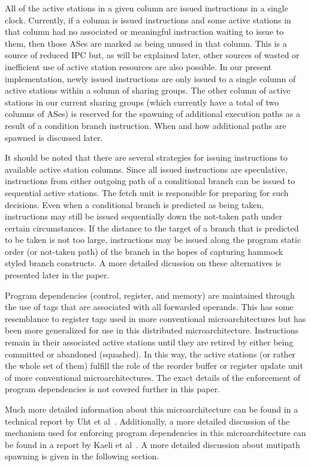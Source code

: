 \documentclass[10pt,dvips]{article}
\begin{document}
All of the active stations in a given column are issued instructions
in a single clock.  Currently, if a column is issued instructions
and some
active stations in that column had no associated or meaningful
instruction waiting to issue to them, then those ASes are marked
as being unused in that column.  This is a source of reduced IPC but, as will
be explained later, other sources of wasted or inefficient use of
active station resources are also possible.
In our present implementation, newly issued instructions
are only issued to a single column of active stations within
a solumn of sharing groups.  The other column of active stations
in our current sharing groups (which currently have a total
of two columns of ASes) is reserved for the spawning of additional
execution paths as a result of a condition branch instruction.
When and how additional paths are spawned is discussed later.

It should be noted that there are several strategies for
issuing instructions to available active station columns.
Since all issued instructions are speculative, instructions
from either outgoing path of a conditional branch can be issued
to sequential active stations.
The fetch unit is responsible for preparing for such decisions.
Even when a conditional branch is predicted as being taken,
instructions may still be issued sequentially down the not-taken
path under certain circumstances.  If the distance to the target 
of a branch
that is predicted to be taken is not too large,
instructions may be issued along the program static order (or not-taken
path) of the branch in the hopes of capturing hammock styled branch
constructs.  A more detailed dicussion on these alternatives is
presented later in the paper.

Program dependencies (control, register, and memory) are 
maintained through the use of tags that
are associated with all forwarded operands.
This has some resemblance to register tags used in more conventional 
microarchitectures but has been more generalized for use in this
distributed microarchitecture.  Instructions remain in their
associated active stations until they are retired by either being
committed or abandoned (squashed).  In this way, the active stations
(or rather the whole set of them)
fulfill the role of the reorder buffer or register update unit of more
conventional microarchitectures.
The exact details of the enforcement of program dependencies
is not covered further in this paper.

Much more detailed information about this microarchitecture
can be found in a technical report by Uht et al~\cite{Uht01}.
Additionally, a more detailed discussion of the mechanism used for
enforcing program dependencies in this microarchitecture
can be found in a report by Kaeli et al~\cite{Uht01}.
A more detailed discussion about mutipath spawning is given
in the following section.
%
\end{document}
